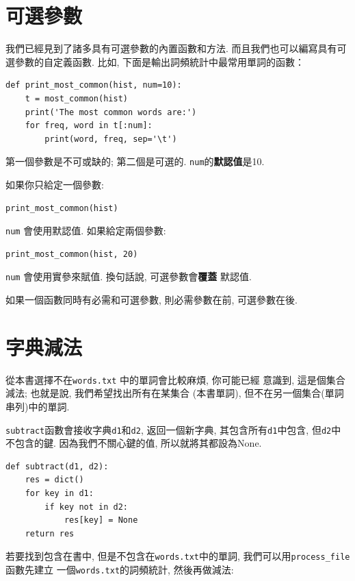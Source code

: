 \documentclass[10pt]{book}
\begin{document}
\section{可選參數}
我們已經見到了諸多具有可選參數的內置函數和方法. 
而且我們也可以編寫具有可選參數的自定義函數. 
比如, 下面是輸出詞頻統計中最常用單詞的函數：

\begin{verbatim}
def print_most_common(hist, num=10):
    t = most_common(hist)
    print('The most common words are:')
    for freq, word in t[:num]:
        print(word, freq, sep='\t')
\end{verbatim}

第一個參數是不可或缺的; 第二個是可選的. 
{\tt num}的{\bf 默認值}是10.

如果你只給定一個參數:

\begin{verbatim}
print_most_common(hist)
\end{verbatim}

{\tt num} 會使用默認值. 如果給定兩個參數:

\begin{verbatim}
print_most_common(hist, 20)
\end{verbatim}

{\tt num} 會使用實參來賦值. 
換句話說, 可選參數會{\bf 覆蓋} 默認值.

如果一個函數同時有必需和可選參數, 
則必需參數在前, 可選參數在後. 


\section{字典減法}
\label{dictsub}
從本書選擇不在{\tt words.txt} 中的單詞會比較麻煩, 你可能已經
意識到, 這是個集合減法; 也就是說, 我們希望找出所有在某集合
(本書單詞), 但不在另一個集合(單詞串列)中的單詞. 

{\tt subtract}函數會接收字典{\tt d1}和{\tt d2}, 返回一個新字典, 
其包含所有{\tt d1}中包含, 但{\tt d2}中不包含的鍵. 
因為我們不關心鍵的值, 所以就將其都設為None.

\begin{verbatim}
def subtract(d1, d2):
    res = dict()
    for key in d1:
        if key not in d2:
            res[key] = None
    return res
\end{verbatim}
%
若要找到包含在書中, 但是不包含在{\tt words.txt}中的單詞, 
我們可以用\verb"process_file" 函數先建立
一個{\tt words.txt}的詞頻統計, 然後再做減法:
\end{document}

